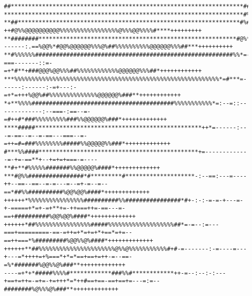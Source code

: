 \documentclass[a4paper, 12pt, oneside]{article}
\begin{document}






\nocite{*}  %
\printbibliography


\tiny\color{white}\begin{verbatim}
##*******************************************************************##%#*+++++++++++++=+*#%%%%%%%%%%%%@@@@@@@@%#####***######*###****++++++++
*********************************************************************#%#**+==++++++=+++*%@%%%@@@@@@@@%%@@@@%%%%%%%%%%%%####%%%%%#****+++++++++
**##****************************************************************#%#***++++++=+=:-++#@%%@@@@@@@@@@%%%%%%%%%%%%%%%%%@%%%@@%%%%#****+++++++++
**########*********************************************************#@%***+=-------:.==%@@%*#@@%@@@@@@%%%@%##%%%%%%%%%%@@@@@@%%%##***++++++++++
**#%%%%%%#########################################################%%*=-===-------::=-=+*#**+###@@@%@@%%%##%%%%%%%%%%%%@@@@@@%%%##*++++++++++++
***%%%%%%%%%%%%%%%%%%%%%%%%%%%%%%%%%%%%%%%%%%%%%%%%%%%%%%%%%%%*=#***=------:------:-=+---:-=+*=+++%@@%##%%%%%%%%%%%%%%@@@@@@%###**++++++++++++
*+**%%%%#########################################%%%%%%%%%%%*=:--=::-------------:--===-:==--=-=#++#*###%%%%%%%%%###%%@@@@@@%###*+++++++++++++
****#####************************************************++*=------:---=-==--=--=-==---===--=-=++=#=###%%%%%%%%#####%%@@@@@%%###*+++++++++++++
#***%%####**********************************************+=-------------=-+=-==**+--+=+=+===-=----**#+**#%%%%%#######%%@@@@@%####*+++++++++++++
***#@%%################*#*********#********************-:--==:---=----++--==--==--=-=---=--=+-=--=--==*##%%##########%@@%@@%####*+++++++++++++
++++++*%%%%%%%%%%%%%%%%##########%%################*#+-:-:-=-=-+---=-+-=====+*=+-=+**+=-++===++=-==---=-==+##########%@@%@@%####*+++++++++++++
++++++*##%%%%%%%%%%%%%%%%#####%%%%%%%%%%%%%%%%%%%##*=-=--:=---===+=========-==-=++=+*=+=+*+==*=+=--==++===*%#########%@@%%@%####*+++++++++++++
++++++**##%%%%%%%%%%%%%%%%%%%%%%@%%@%%%%%%%%%%%#+#-=-------:-=----=---+---=*++++=+%===*+*=*==+==+=++-=--==-=%*#######%@@%%@%###**+++++++++++++
----=+*+*#####%%%%#************###%%#************++-=--:--:-:---+==+=++=-=+=-+=+++*=*++#==+==-==+==+=---=:=--########%@%%%@%###**+++++++++++++

\end{verbatim}
\end{document}
